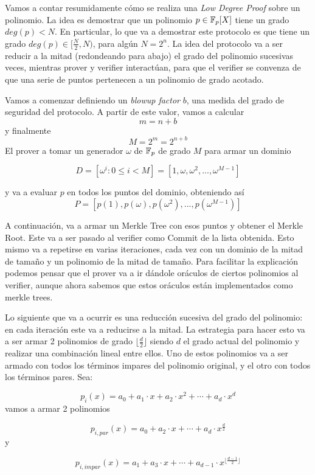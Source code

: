 \documentclass[11pt,a4paper]{tesis}
\begin{document}
Vamos a contar resumidamente cómo se realiza una \textit{Low Degree Proof} sobre un polinomio. La idea es demostrar que un polinomio $p \in \mathbb{F}_p[X]$ tiene un grado $deg(p) < N$. En particular, lo que va a demostrar este protocolo es que tiene un grado $deg(p) \in [\frac{N}{2}, N)$, para algún $N = 2^n$. La idea del protocolo va a ser reducir a la mitad (redondeando para abajo) el grado del polinomio sucesivas veces, mientras prover y verifier interactúan, para que el verifier se convenza de que una serie de puntos pertenecen a un polinomio de grado acotado. 

Vamos a comenzar definiendo un \textit{blowup factor} $b$, una medida del grado de seguridad del protocolo. A partir de este valor, vamos a calcular 
$$m = n + b$$ y finalmente $$M = 2^m = 2 ^{n+b}$$
El prover a tomar un generador $\omega$ de $\mathbb{F}_p$ de grado $M$ para armar un dominio

$$D=[\omega^i : 0 \leq i < M] = [1, \omega, \omega^2, ..., \omega^{M-1}]$$

\noindent y va a evaluar $p$ en todos los puntos del dominio, obteniendo así 
$$P = [p(1), p(\omega), p(\omega^2), ..., p(\omega^{M-1})]$$

A continuación, va a armar un Merkle Tree con esos puntos y obtener el Merkle Root. Este va a ser pasado al verifier como Commit de la lista obtenida. Esto mismo va a repetirse en varias iteraciones, cada vez con un dominio de la mitad de tamaño y un polinomio de la mitad de tamaño. Para facilitar la explicación podemos pensar que el prover va a ir dándole oráculos de ciertos polinomios al verifier, aunque ahora sabemos que estos oráculos están implementados como merkle trees. 

Lo siguiente que va a ocurrir es una reducción sucesiva del grado del polinomio: en cada iteración este va a reducirse a la mitad. La estrategia para hacer esto va a ser armar 2 polinomios de grado $\lfloor \frac{d}{2} \rfloor$ siendo $d$ el grado actual del polinomio y realizar una combinación lineal entre ellos. Uno de estos polinomios va a ser armado con todos los términos impares del polinomio original, y el otro con todos los términos pares. Sea:
 
$$p_i(x)= a_0 + a_1 \cdot x + a_2 \cdot x^2 + \cdots +  a_d \cdot x^d$$
vamos a armar 2 polinomios

$$p_{i, par}(x) = a_0 + a_2 \cdot x + \cdots + a_d \cdot x^{\frac{d}{2}}$$ y

$$p_{i,impar}(x) = a_1 + a_3 \cdot x +\cdots + a_{d-1} \cdot x^{\lfloor\frac{d-1}{2}\rfloor}$$
\end{document}
